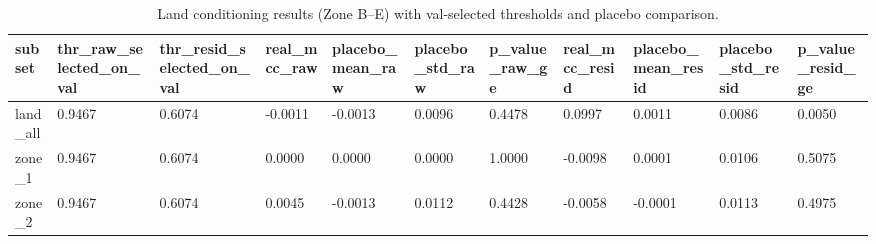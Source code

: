 \begin{table}
\caption{Land conditioning results (Zone B--E) with val-selected thresholds and placebo comparison.}
\label{tab:tableS9}
\begin{tabular}{lllllllllll}
\toprule
subset & thr\_raw\_selected\_on\_val & thr\_resid\_selected\_on\_val & real\_mcc\_raw & placebo\_mean\_raw & placebo\_std\_raw & p\_value\_raw\_ge & real\_mcc\_resid & placebo\_mean\_resid & placebo\_std\_resid & p\_value\_resid\_ge \\
\midrule
land\_all & 0.9467 & 0.6074 & -0.0011 & -0.0013 & 0.0096 & 0.4478 & 0.0997 & 0.0011 & 0.0086 & 0.0050 \\
zone\_1 & 0.9467 & 0.6074 & 0.0000 & 0.0000 & 0.0000 & 1.0000 & -0.0098 & 0.0001 & 0.0106 & 0.5075 \\
zone\_2 & 0.9467 & 0.6074 & 0.0045 & -0.0013 & 0.0112 & 0.4428 & -0.0058 & -0.0001 & 0.0113 & 0.4975 \\
\bottomrule
\end{tabular}
\end{table}
